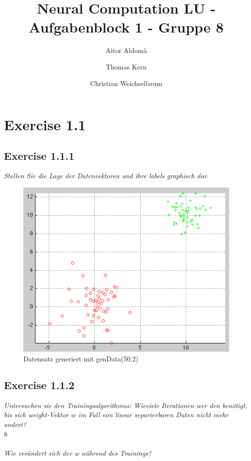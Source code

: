 \documentclass[10pt, journal,compsoc]{article}
\begin{document}
\title{Neural Computation LU - Aufgabenblock 1 - Gruppe 8}


\author{Aitor Aldomà \and Thomas Kern \and Christian Weichselbaum}
        

\section{Exercise 1.1}
\subsection{Exercise 1.1.1}
\textit{Stellen Sie die Lage der Datenvektoren und ihre labels graphisch dar.}

\begin{figure}[htp]
	\centering
	\includegraphics[width=1\textwidth]{ab1_1_1}
	\caption{Datensatz generiert mit genData(50,2)}\label{fig:1}
\end{figure}

\subsection{Exercise 1.1.2}

\textit{Untersuchen sie den Trainingsalgorithmus: Wieviele Iterationen wer den benötigt, bis sich weight-Vektor $w$ im Fall von linear separierbaren Daten nicht mehr andert?}
\\
8
\\
\\
\textit{Wie verändert sich der w während des Trainings?}
\\
\end{document}
